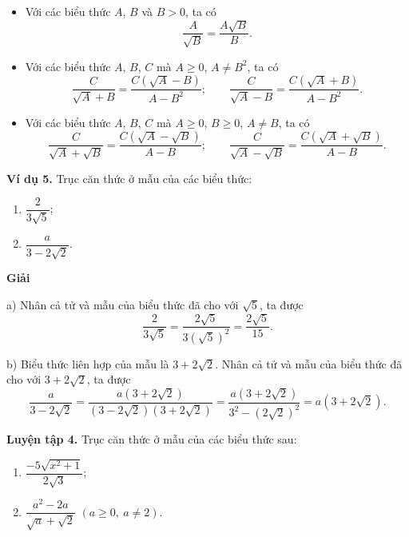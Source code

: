 \begin{lesson}
    \answerline
    \answerline

    \begin{keyconcept}
        \begin{itemize}
            \item Với các biểu thức $A$, $B$ và $B>0$, ta có
            \[
                \dfrac{A}{\sqrt B}=\dfrac{A\sqrt B}{B}.
            \]
            \item Với các biểu thức $A$, $B$, $C$ mà $A\ge0$, $A\ne B^2$, ta có
            \[
                \dfrac{C}{\sqrt A+B}=\dfrac{C(\sqrt A-B)}{A-B^2};
                \qquad
                \dfrac{C}{\sqrt A-B}=\dfrac{C(\sqrt A+B)}{A-B^2}.
            \]
            \item Với các biểu thức $A$, $B$, $C$ mà $A\ge0$, $B\ge0$, $A\ne B$, ta có
            \[
                \dfrac{C}{\sqrt A+\sqrt B}
                =\dfrac{C(\sqrt A-\sqrt B)}{A-B};
                \qquad
                \dfrac{C}{\sqrt A-\sqrt B}
                =\dfrac{C(\sqrt A+\sqrt B)}{A-B}.
            \]
        \end{itemize}
    \end{keyconcept}

    \textbf{Ví dụ 5.} Trục căn thức ở mẫu của các biểu thức:
    \begin{enumerate}[label=\alph*)]
        \item $\dfrac2{3\sqrt5}$;
        \item $\dfrac a{3-2\sqrt2}$.
    \end{enumerate}

    \textbf{Giải}

    a) Nhân cả tử và mẫu của biểu thức đã cho với $\sqrt5$, ta được
    \[
        \dfrac2{3\sqrt5}
        =\dfrac{2\sqrt5}{3(\sqrt5)^2}
        =\dfrac{2\sqrt5}{15}.
    \]

    b) Biểu thức liên hợp của mẫu là $3+2\sqrt2$. Nhân cả tử và mẫu của biểu thức đã cho với $3+2\sqrt2$, ta được
    \[
        \dfrac a{3-2\sqrt2}
        =\dfrac{a(3+2\sqrt2)}{(3-2\sqrt2)(3+2\sqrt2)}
        =\dfrac{a(3+2\sqrt2)}{3^2-(2\sqrt2)^2}
        =a(3+2\sqrt2).
    \]

    \textbf{Luyện tập 4.} Trục căn thức ở mẫu của các biểu thức sau:
    \begin{enumerate}[label=\alph*)]
        \item $\dfrac{-5\sqrt{x^2+1}}{2\sqrt3}$;
        \item $\dfrac{a^2-2a}{\sqrt a+\sqrt2}$ $(a\ge0,\ a\ne2)$.
    \end{enumerate}


\end{lesson}
